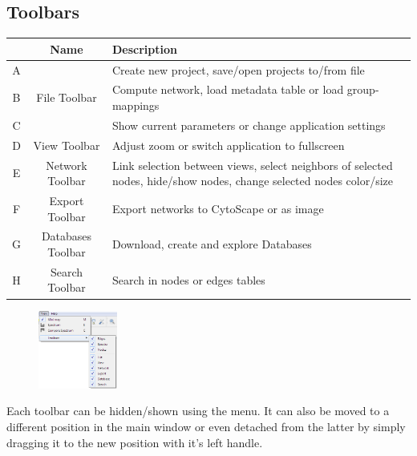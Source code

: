 \documentclass[12pt,a4paper,titlepage,dvipsnames]{article}
\begin{document}
\subsection{Toolbars}
\label{toolbars}
\begin{center}
\begin{tabularx}{\textwidth}{|c|c|X|}
	\hline
	& \bf Name & \bf Description\\
  	\hline
   	A & \multirow{3}{*}{File Toolbar} & Create new project, save/open projects to/from file\\
   	B & & Compute network, load metadata table or load group-mappings \\
   	C & & Show current parameters or change application settings \\
   	\hline
   	D & View Toolbar & Adjust zoom or switch application to fullscreen \\
   	\hline
   	E & Network Toolbar & Link selection between views, select neighbors of selected nodes, hide/show nodes, change selected nodes color/size\\
   	\hline
   	F & Export Toolbar & Export networks to CytoScape or as image\\
   	\hline
   	G & Databases Toolbar & Download, create and explore Databases\\
   	\hline
   	H & Search Toolbar & Search in nodes or edges tables\\
   	\hline
\end{tabularx}
\end{center}

\begin{figure}
    \vspace{-.5cm}
	\includegraphics[width=0.23\textwidth]{view-toolbars-menu}
\end{figure}

Each toolbar can be hidden/shown using the  menu. It can also be moved to a different position in the main window or even detached from the latter by simply dragging it to the new position with it's left handle.
\end{document}
